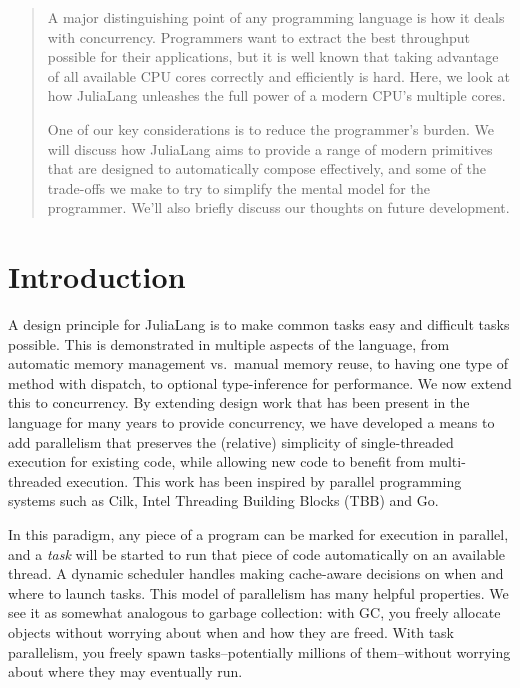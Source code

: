 \documentclass{juliacon}
\begin{document}


\maketitle


\begin{abstract}

A major distinguishing point of any programming language is how it deals with concurrency. Programmers want to extract the best throughput possible for their applications, but it is well known that taking advantage of all available CPU cores correctly and efficiently is hard. Here, we look at how JuliaLang unleashes the full power of a modern CPU's multiple cores.

One of our key considerations is to reduce the programmer's burden. We will discuss how JuliaLang aims to provide a range of modern primitives that are designed to automatically compose effectively, and some of the trade-offs we make to try to simplify the mental model for the programmer. We'll also briefly discuss our thoughts on future development.


\end{abstract}

\section{Introduction}
\label{subsub:intro}

A design principle for JuliaLang is to make common tasks easy and difficult tasks possible. This is demonstrated in multiple aspects of the language, from automatic memory management vs.\ manual memory reuse, to having one type of method with dispatch, to optional type-inference for performance. We now extend this to concurrency. By extending design work that has been present in the language for many years to provide concurrency, we have developed a means to add parallelism that preserves the (relative) simplicity of single-threaded execution for existing code, while allowing new code to benefit from multi-threaded execution. This work has been inspired by parallel programming systems such as Cilk, Intel Threading Building Blocks (TBB) and Go.

In this paradigm, any piece of a program can be marked for execution in parallel, and a \emph{task} will be started to run that piece of code automatically on an available thread. A dynamic scheduler handles making cache-aware decisions on when and where to launch tasks. This model of parallelism has many helpful properties. We see it as somewhat analogous to garbage collection: with GC, you freely allocate objects without worrying about when and how they are freed. With task parallelism, you freely spawn tasks--potentially millions of them--without worrying about where they may eventually run.
\end{document}
